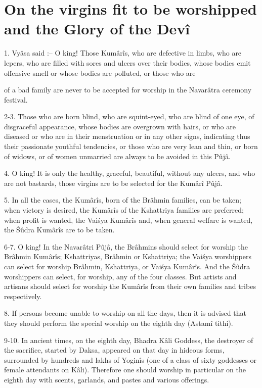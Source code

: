 ﻿\chapter{On the virgins fit to be worshipped and the Glory of the Dev\^i}

1. Vy\^asa said :-- O king! Those Kum\^ar\^is, who are defective in limbs, who are lepers, who are filled with sores and ulcers over their bodies, whose bodies emit offensive smell or whose bodies are polluted, or those who are

of a bad family are never to be accepted for worship in the Navar\^atra ceremony festival.

2-3. Those who are born blind, who are squint-eyed, who are blind of one eye, of disgraceful appearance, whose bodies are overgrown with hairs, or who are diseased or who are in their menstruation or in any other signs, indicating thus their passionate youthful tendencies, or those who are very lean and thin, or born of widows, or of women unmarried are always to be avoided in this Pûj\^a.

4. O king! It is only the healthy, graceful, beautiful, without any ulcers, and who are not bastards, those virgins are to be selected for the Kum\^ar\^i Pûj\^a.

5. In all the cases, the Kum\^ar\^is, born of the Br\^ahmin families, can be taken; when victory is desired, the Kum\^ar\^is of the Kshattriya families are preferred; when profit is wanted, the Vai\'sya Kum\^ar\^is and, when general welfare is wanted, the \'Sûdra Kum\^ar\^is are to be taken.

6-7. O king! In the Navar\^atri Pûj\^a, the Br\^ahmins should select for worship the Br\^ahmin Kum\^ar\^is; Kshattriyas, Br\^ahmin or Kshattriya; the Vai\'sya worshippers can select for worship Br\^ahmin, Kshattriya, or Vai\'sya Kum\^ar\^is. And the \'Sûdra worshippers can select, for worship, any of the four classes. But artists and artisans should select for worship the Kum\^ar\^is from their own families and tribes respectively.

8. If persons become unable to worship on all the days, then it is advised that they should perform the special worship on the eighth day (Astam\^i tithi).

9-10. In ancient times, on the eighth day, Bhadra K\^ali Goddess, the destroyer of the sacrifice, started by Daksa, appeared on that day in hideous forms, surrounded by hundreds and lakhs of Yogin\^is (one of a class of sixty goddesses or female attendants on K\^ali). Therefore one should worship in particular on the eighth day with scents, garlands, and pastes and various offerings.

